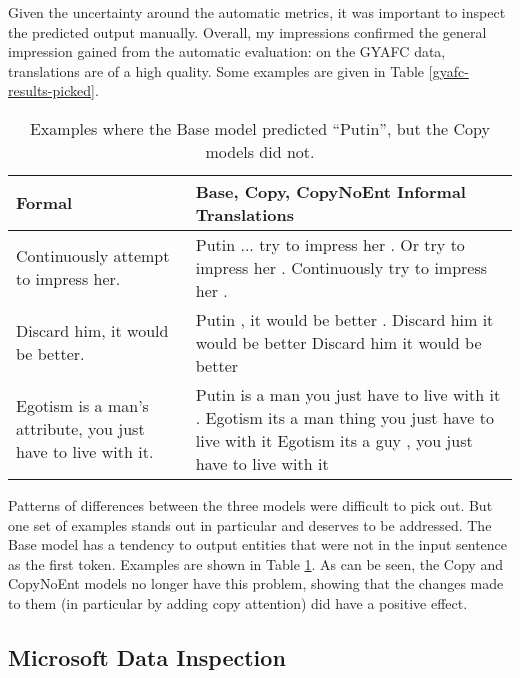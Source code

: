 Given the uncertainty around the automatic metrics, it was important to inspect the predicted output manually. Overall, my impressions confirmed the general impression gained from the automatic evaluation: on the GYAFC data, translations are of a high quality. Some examples are given in Table \ref{gyafc-results-picked}.

\begin{table}[h]
\centering
 \begin{tabular}{|| p{4cm} | p{8cm} ||} 
 \hline
 Formal & Base, Copy, CopyNoEnt Informal Translations \\ [0.3ex] 
 \hline\hline
 Continuously attempt to impress her. & 
    Putin ... try to impress her . 
    \newline Or try to impress her .
    \newline Continuously try to impress her . \\
 \hline
 Discard him, it would be better. & 
    Putin , it would be better . 
    \newline Discard him it would be better
    \newline Discard him it would be better \\
 \hline
 Egotism is a man's attribute, you just have to live with it. & 
    Putin is a man you just have to live with it .
    \newline Egotism its a man thing you just have to live with it
    \newline Egotism its a guy , you just have to live with it \\
 \hline
\end{tabular}
\caption{Examples where the Base model predicted ``Putin'', but the Copy models did not.}
\label{gyafc-results-putin}
\end{table}

Patterns of differences between the three models were difficult to pick out. But one set of examples stands out in particular and deserves to be addressed. The Base model has a tendency to output entities that were not in the input sentence as the first token. Examples are shown in Table \ref{gyafc-results-putin}. As can be seen, the Copy and CopyNoEnt models no longer have this problem, showing that the changes made to them (in particular by adding copy attention) did have a positive effect.

\subsection{Microsoft Data Inspection}

